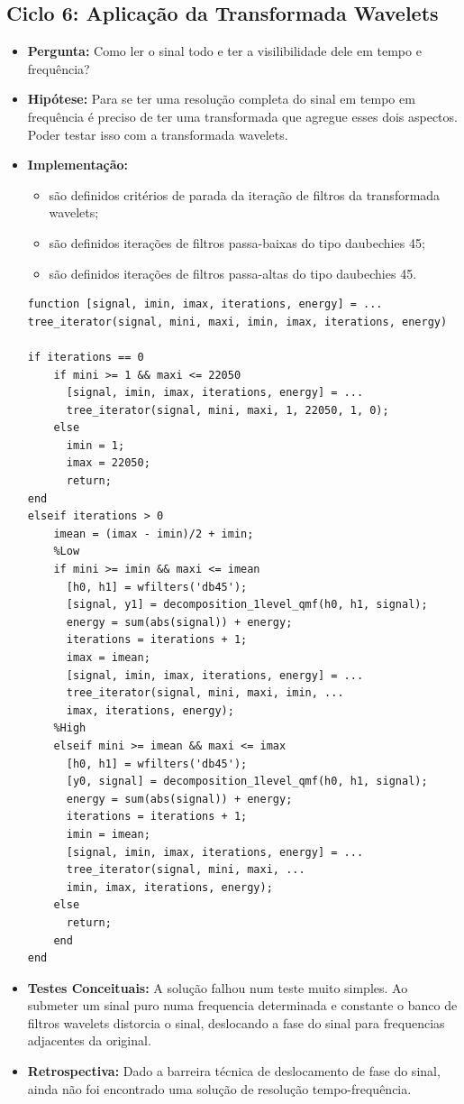 \subsection{Ciclo 6: Aplicação da Transformada Wavelets}
\label{subsec:ciclo_6}
\begin{itemize}
\item \textbf{Pergunta:} Como ler o sinal todo e ter a visilibilidade dele em tempo e frequência?
\item \textbf{Hipótese:} Para se ter uma resolução completa do sinal em tempo em frequência é preciso de ter uma transformada que agregue esses dois aspectos. Poder testar isso com a transformada wavelets.   
\item \textbf{Implementação:}
\begin{itemize} 
	\item são definidos critérios de parada da iteração de filtros da transformada wavelets;
	\item são definidos iterações de filtros passa-baixas do tipo daubechies 45;
	\item são definidos iterações de filtros passa-altas do tipo daubechies 45.
\end{itemize}
\begin{lstlisting}
function [signal, imin, imax, iterations, energy] = ...
tree_iterator(signal, mini, maxi, imin, imax, iterations, energy)

if iterations == 0
	if mini >= 1 && maxi <= 22050
	  [signal, imin, imax, iterations, energy] = ...
	  tree_iterator(signal, mini, maxi, 1, 22050, 1, 0);
	else
	  imin = 1;
	  imax = 22050;
	  return;
end
elseif iterations > 0
	imean = (imax - imin)/2 + imin;
	%Low
	if mini >= imin && maxi <= imean
	  [h0, h1] = wfilters('db45');
	  [signal, y1] = decomposition_1level_qmf(h0, h1, signal);
	  energy = sum(abs(signal)) + energy;
	  iterations = iterations + 1;
	  imax = imean;
	  [signal, imin, imax, iterations, energy] = ...
	  tree_iterator(signal, mini, maxi, imin, ...
	  imax, iterations, energy);
	%High 
	elseif mini >= imean && maxi <= imax
	  [h0, h1] = wfilters('db45');
	  [y0, signal] = decomposition_1level_qmf(h0, h1, signal);
	  energy = sum(abs(signal)) + energy;
	  iterations = iterations + 1;
	  imin = imean;
	  [signal, imin, imax, iterations, energy] = ...
	  tree_iterator(signal, mini, maxi, ...
	  imin, imax, iterations, energy);
	else
	  return;
	end
end

\end{lstlisting}
\item \textbf{Testes Conceituais:} A solução falhou num teste muito simples. Ao submeter um sinal puro numa frequencia determinada e constante o banco de filtros wavelets distorcia o sinal, deslocando a fase do sinal para frequencias adjacentes da original.
\item \textbf{Retrospectiva:} Dado a barreira técnica de deslocamento de fase do sinal, ainda não foi encontrado uma solução de resolução tempo-frequência.
\end{itemize}


